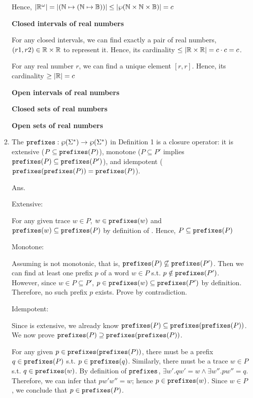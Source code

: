 \documentclass{article}
\begin{document}
\begin{enumerate}
Hence, $|\mathbb{R}^\omega| = |(\mathbb{N}\mapsto(\mathbb{N}\mapsto\mathbb{B}))| \leq |\wp(\mathbb{N}\times\mathbb{N}\times\mathbb{B})| = c$

\textbf{Closed intervals of real numbers}

For any closed intervals, we can find exactly a pair of real numbers,
$(r1, r2) \in \mathbb{R}\times\mathbb{R}$ to represent it.
Hence, its cardinality $\leq |\mathbb{R}\times\mathbb{R}| = c\cdot c = c$.

For any real number $r$, we can find a unique element $[r, r]$.
Hence, its cardinality $\geq |\mathbb{R}| = c$

\textbf{Open intervals of real numbers}

\bigskip

\textbf{Closed sets of real numbers}

\bigskip

\textbf{Open sets of real numbers}

\bigskip

\item The $\mathtt{prefixes}: \wp(\Sigma^*) \to \wp(\Sigma^*)$ in Definition 1
is a closure operator: it is extensive ($P \subseteq \mathtt{prefixes}(P)$),
monotone ($P \subseteq P'$ implies $\mathtt{prefixes}(P) \subseteq \mathtt{prefixes}(P')$),
and idempotent ($\mathtt{prefixes}(\mathtt{prefixes}(P)) = \mathtt{prefixes}(P)$).

Ans.

Extensive:

For any given trace $w \in P$, $w \in \mathtt{prefixes}(w)$ and
$\mathtt{prefixes}(w) \subseteq \mathtt{prefixes}(P)$ by definition of \prefixes.
Hence, $P \subseteq \mathtt{prefixes}(P)$

\medskip

Monotone:

Assuming \prefixes is not monotonic, that is,
$\mathtt{prefixes}(P) \not\subseteq \mathtt{prefixes}(P')$.
Then we can find at least one prefix $p$ of a word $w \in P$ s.t.
$p \notin \mathtt{prefixes}(P')$.
However, since $w \in P \subseteq P'$,
$p \in \mathtt{prefixes}(w) \subseteq \mathtt{prefixes}(P')$ by definition.
Therefore, no such prefix $p$ exists. Prove by contradiction.

\medskip

Idempotent:

Since \prefixes is extensive, we already know
$\mathtt{prefixes}(P)\subseteq\mathtt{prefixes}(\mathtt{prefixes}(P))$.
We now prove $\mathtt{prefixes}(P)\supseteq\mathtt{prefixes}(\mathtt{prefixes}(P))$.

For any given $p \in \mathtt{prefixes}(\mathtt{prefixes}(P))$,
there must be a prefix $q \in \mathtt{prefixes}(P)$ s.t. $p \in \mathtt{prefixes}(q)$.
Similarly, there must be a trace $w \in P$ s.t. $q \in \mathtt{prefixes}(w)$.
By definition of $\mathtt{prefixes}$, $\exists w'. qw' = w \land \exists w''. pw'' = q$.
Therefore, we can infer that $pw'w'' = w$; hence $p \in \mathtt{prefixes}(w)$.
Since $w \in P$, we conclude that $p \in \mathtt{prefixes}(P)$. 


\end{enumerate}
\end{document}
